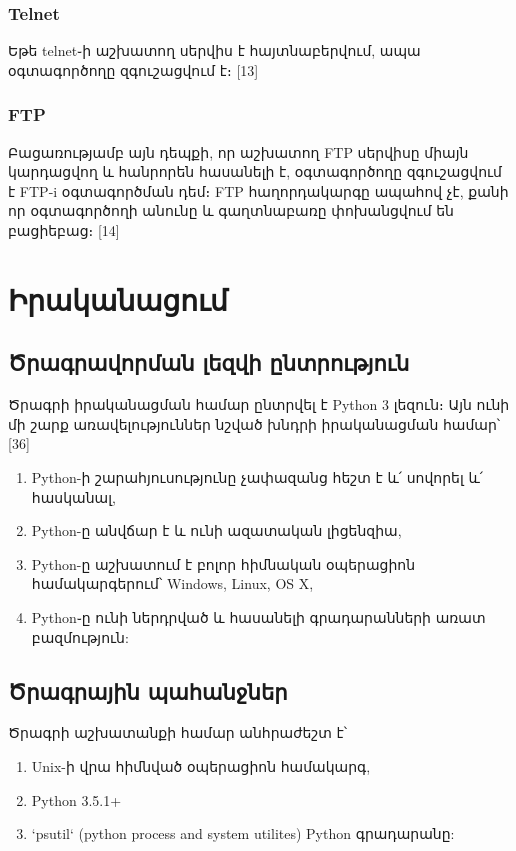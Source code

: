 \documentclass[a4paper,12pt]{article}
\begin{document}
\begin{sloppypar}
\subsubsection{Telnet}

Եթե telnet֊ի աշխատող սերվիս է հայտնաբերվում, ապա օգտագործողը զգուշացվում է։
[13]

\subsubsection{FTP}

Բացառությամբ այն դեպքի, որ աշխատող FTP սերվիսը միայն կարդացվող և
հանրորեն հասանելի է, օգտագործողը զգուշացվում է FTP-i օգտագործման դեմ։
FTP հաղորդակարգը ապահով չէ, քանի որ օգտագործողի անունը և
գաղտնաբառը փոխանցվում են բացիեբաց։ [14]


\section{Իրականացում}


\subsection{Ծրագրավորման լեզվի ընտրություն}


Ծրագրի իրականացման համար ընտրվել է Python 3 լեզուն։
Այն ունի մի շարք առավելություններ նշված խնդրի իրականացման համար՝
[36]
\begin{enumerate}
\item Python-ի շարահյուսությունը չափազանց հեշտ է և՛ սովորել և՛ հասկանալ,
\item Python-ը անվճար է և ունի ազատական լիցենզիա,
\item Python-ը աշխատում է բոլոր հիմնական օպերացիոն համակարգերում՝ Windows, Linux, OS X,
\item Python֊ը ունի ներդրված և հասանելի գրադարանների առատ բազմություն:
\end{enumerate}


\subsection{Ծրագրային պահանջներ}

Ծրագրի աշխատանքի համար անհրաժեշտ է՝

\begin{enumerate}
\item Unix-ի վրա հիմնված օպերացիոն համակարգ,
\item Python 3.5.1+
\item `psutil` (python process and system utilites) Python գրադարանը:
\end{enumerate}


\end{sloppypar}
\end{document}
